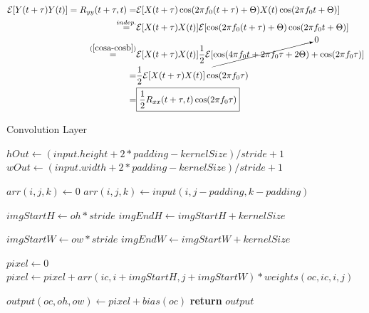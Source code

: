 \begin{align}
	\mathcal{E}[Y(t+\tau)Y(t)] = R_{yy}(t+\tau,t) =& \mathcal{E} [X( t + \tau) \cos(2 \pi f_0 (t + \tau) + \Theta) X(t) \cos(2 \pi f_0 t + \Theta)] \nonumber \\
	\overset{indep.}{=}& \mathcal{E}[X(t+\tau)X(t)] \mathcal{E}[\cos(2\pi f_0(t+\tau) +\Theta)\cos(2\pi f_0t + \Theta)] \nonumber \\
	\overset{(\ref{cosa-cosb})}{=}& \mathcal{E}[X(t+\tau)X(t)]\frac{1}{2}\mathcal{E}[\cancelto{0}{\cos(4\pi f_0t+2\pi f_0\tau+2\Theta)} + \cos(2\pi f_0\tau)] \nonumber \\
	=& \frac{1}{2} \mathcal{E}[X(t+\tau)X(t)] \cos(2\pi f_0\tau) \nonumber \\ 
	=& \boxed{ \frac{1}{2} R_{xx}(t+\tau,t)\cos(2\pi f_0\tau)}
\end{align}


%
% 

\begin{algorithm}[H]
	\caption{Convolution Layer}\label{alg:Convolution-Layer}
	\begin{algorithmic}[1]
			\State $hOut \gets (input.height +2 * padding - kernelSize) / stride + 1$
			\State $wOut \gets (input.width +2 * padding - kernelSize) / stride + 1$

							\State $arr(i, j, k) \gets 0$
						\Else{}
							\State $arr(i, j, k) \gets input(i, j - padding, k - padding)$
						\EndIf
					\EndFor
				\EndFor
			\EndFor

			 
					\State $imgStartH \gets oh * stride$
					\State $imgEndH \gets imgStartH + kernelSize$

						\State $imgStartW \gets ow * stride$
						\State $imgEndW \gets imgStartW + kernelSize$

						\State $pixel \gets 0$
									\State $pixel \gets pixel + arr(ic, i + imgStartH, j + imgStartW) * weights(oc, ic, i, j)$
								\EndFor
							\EndFor
						\EndFor

						\State $output(oc, oh, ow) \gets pixel + bias(oc)$
					\EndFor
				\EndFor
			\EndFor
			\State \textbf{return} $output$
		\EndProcedure
	\end{algorithmic}
\end{algorithm}
